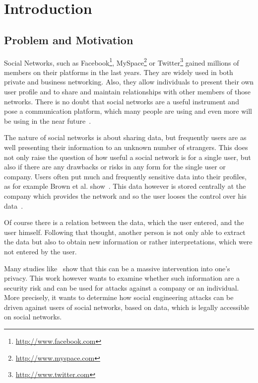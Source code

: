 \chapter{Introduction}
\label{chap:introduction}

\section{Problem and Motivation}

Social Networks, such as Facebook\footnote{\url{http://www.facebook.com}},
MySpace\footnote{\url{http://www.myspace.com}} or
Twitter\footnote{\url{http://www.twitter.com}} gained millions of members on
their platforms in the last years. They are widely used in both private and
business networking. Also, they allow individuals to present their own user
profile and to share and maintain relationships with other members of those
networks. There is no doubt that social networks are a useful instrument and
pose a communication platform, which many people are using and even more will
be using in the near future~\cite{whitworth2009}.

The nature of social networks is about sharing data, but frequently users are
as well presenting their information to an unknown number of strangers. This
does not only raise the question of how useful a social network is for a single
user, but also if there are any drawbacks or risks in any form for the single
user or company. Users often put much and frequently sensitive data into their
profiles, as for example Brown et al. show~\cite{brown2008}. This data however
is stored centrally at the company which provides the network and so the user
looses the control over his data~\cite{fraunhofer2008}.

Of course there is a relation between the data, which the user entered, and the
user himself. Following that thought, another person is not only able to
extract the data but also to obtain new information or rather interpretations,
which were not entered by the user.

Many studies like~\cite{fraunhofer2008,gross2005} show that this can be a
massive intervention into one's privacy. This work however wants to examine
whether such information are a security risk and can be used for attacks
against a company or an individual. More precisely, it wants to determine how
social engineering attacks can be driven against users of social networks,
based on data, which is legally accessible on social networks.

